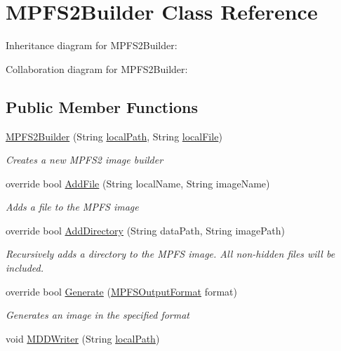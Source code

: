 \hypertarget{class_microchip_1_1_m_p_f_s2_builder}{}\section{M\+P\+F\+S2\+Builder Class Reference}
\label{class_microchip_1_1_m_p_f_s2_builder}


Inheritance diagram for M\+P\+F\+S2\+Builder\+:


Collaboration diagram for M\+P\+F\+S2\+Builder\+:
\subsection*{Public Member Functions}
\begin{DoxyCompactItemize}
\item 
\hyperlink{class_microchip_1_1_m_p_f_s2_builder_af864e6d39a5cee14c38b0f54730ef757}{M\+P\+F\+S2\+Builder} (String \hyperlink{class_microchip_1_1_m_p_f_s_builder_a50bcab31eeaf73bd5975d595d2bbe8cf}{local\+Path}, String \hyperlink{class_microchip_1_1_m_p_f_s_builder_ab110f2474a6be5f43ee032058d6ddd65}{local\+File})
\begin{DoxyCompactList}\small\item\em Creates a new M\+P\+F\+S2 image builder \end{DoxyCompactList}\item 
override bool \hyperlink{class_microchip_1_1_m_p_f_s2_builder_aabf44779c0c6c813d9d25aa890fae0cf}{Add\+File} (String local\+Name, String image\+Name)
\begin{DoxyCompactList}\small\item\em Adds a file to the M\+P\+F\+S image \end{DoxyCompactList}\item 
override bool \hyperlink{class_microchip_1_1_m_p_f_s2_builder_afed308f440de4af9b943d9e0bb4e4ced}{Add\+Directory} (String data\+Path, String image\+Path)
\begin{DoxyCompactList}\small\item\em Recursively adds a directory to the M\+P\+F\+S image. All non-\/hidden files will be included. \end{DoxyCompactList}\item 
override bool \hyperlink{class_microchip_1_1_m_p_f_s2_builder_a6b6e569a945c1c9c3e59c93a353f006b}{Generate} (\hyperlink{namespace_microchip_aa4ebbf0f9a9e92e601f6a9aac07b5e1e}{M\+P\+F\+S\+Output\+Format} format)
\begin{DoxyCompactList}\small\item\em Generates an image in the specified format \end{DoxyCompactList}\item 
void \hyperlink{class_microchip_1_1_m_p_f_s2_builder_ad6147e07633910b2084bd03bb78721bc}{M\+D\+D\+Writer} (String \hyperlink{class_microchip_1_1_m_p_f_s_builder_a50bcab31eeaf73bd5975d595d2bbe8cf}{local\+Path})
\end{DoxyCompactItemize}
